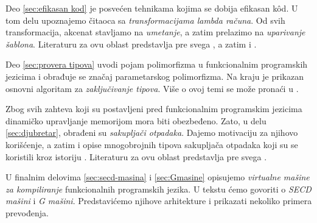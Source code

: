 Deo \ref{sec:efikasan kod} je posvećen tehnikama kojima se dobija efikasan k\^od. U tom delu upoznajemo čitaoca sa \textit{transformacijama lambda računa}. Od svih transformacija, akcenat stavljamo na \textit{umetanje}, a zatim prelazimo na \textit{uparivanje šablona}. Literaturu za ovu oblast predstavlja pre svega \cite{the-implementation-of-functional-programming-languages}, a zatim i \cite{compilation-by-program-transformation, haskell-by-program-transformation, secrets-haskell-compiler-inliner, compiler-design, compiling-fl}.

Deo \ref{sec:provera tipova} uvodi pojam polimorfizma u funkcionalnim programskih jezicima i obrađuje se značaj parametarskog polimorfizma. Na kraju je prikazan osnovni algoritam za \textit{zaključivanje tipova}. Više o ovoj temi se može pronaći u \cite{the-implementation-of-functional-programming-languages, basic-typechecking}.

Zbog svih zahteva koji su postavljeni pred funkcionalnim programskim jezicima dinamičko upravljanje memorijom mora biti obezbeđeno. Zato, u delu \ref{sec:djubretar}, obrađeni su \textit{sakupljači otpadaka}. Dajemo motivaciju za njihovo korišćenje, a zatim i opise mnogobrojnih tipova sakupljača otpadaka koji su se koristili kroz istoriju \cite{appel, mcca60, col60, feni69, app87}. Literaturu za ovu oblast predstavlja pre svega \cite{the-implementation-of-functional-programming-languages}.

U finalnim delovima \ref{sec:secd-masina} i \ref{sec:Gmasine} opisujemo \textit{virtualne mašine za kompiliranje} funkcionalnih programskih jezika. U tekstu ćemo govoriti o \textit{SECD mašini} i \textit{G mašini}. Predstavićemo njihove arhitekture i prikazati nekoliko primera prevođenja.
